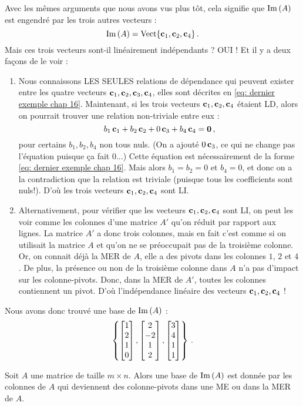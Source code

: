 \begin{myprob}
\begin{mysol}
Avec les mêmes arguments que nous avons vus plus tôt, cela signifie que $\operatorname{Im}\,(A)$ est engendré par les trois autres vecteurs :
$$
\operatorname{Im}\,(A) = \textrm{Vect}\{ \mathbf{c}_1, \mathbf{c}_2, \mathbf{c}_4\}\,.
$$
Mais ces trois vecteurs sont-il linéairement indépendants ?  OUI !  Et il y a deux façons de le voir :
\begin{enumerate}
\item Nous connaissons LES SEULES relations de dépendance qui peuvent exister entre les quatre vecteurs $\mathbf{c}_1, \mathbf{c}_2,\mathbf{c}_3, \mathbf{c}_4$, elles sont décrites en \eqref{eq: dernier exemple chap 16}.  Maintenant, si les
trois vecteurs $\mathbf{c}_1, \mathbf{c}_2, \mathbf{c}_4$ étaient LD, alors on pourrait trouver
une relation non-triviale entre eux :
$$
b_1 \,\mathbf{c}_1 + b_2\,\mathbf{c}_2 + 0\, \mathbf{c}_3+ b_4 \,\mathbf{c}_4 = \mathbf{0}\,,
$$
pour certains $b_1, b_2, b_4$ non tous nuls.
(On a ajouté $0\,\mathbf{c}_3$, ce qui ne change pas l'équation puisque ça fait $0$...)
Cette équation est nécessairement de la forme \eqref{eq: dernier exemple chap 16}. Mais alors $b_1=b_2=0$ et $b_4=0$, et donc on a la contradiction que la relation est triviale (puisque tous les coefficients sont nuls!). D'où les trois vecteurs $\mathbf{c}_1, \mathbf{c}_2, \mathbf{c}_4$ sont LI.
\item Alternativement, pour vérifier que les vecteurs $\mathbf{c}_1, \mathbf{c}_2, \mathbf{c}_4$ sont LI, on peut les voir comme les colonnes d'une matrice $A'$ qu'on réduit par rapport aux lignes. La matrice $A'$ a donc trois colonnes, mais en fait c'est comme si on utilisait la matrice $A$ et qu'on ne se préoccupait pas de la troisième colonne. Or, on connait déjà la MER de $A$, elle a des pivots dans les colonnes $1$, $2$ et $4$. De plus, la présence ou non de la troisième colonne dans $A$ n'a pas d'impact sur les colonne-pivots. Donc, dans la MER de $A'$, toutes les colonnes contiennent un pivot. D'où l'indépendance linéaire des vecteurs $\mathbf{c}_1, \mathbf{c}_2, \mathbf{c}_4$ !
\end{enumerate}

Nous avons donc trouvé une base de $\operatorname{Im}\,(A)$ :
$$
\left\{ \left[ \begin{matrix} 1\\2\\1\\0 \end{matrix} \right], \left[ \begin{matrix} 2\\-2\\1\\2 \end{matrix} \right], \left[ \begin{matrix} 3\\4\\1\\1 \end{matrix} \right] \right\}\,.
$$
\end{mysol}\end{myprob}

\begin{theorem}
Soit $A$ une matrice de taille $m\times n$.  Alors une base de $\operatorname{Im}\,(A)$ est donnée par les colonnes de $A$ qui deviennent des colonne-pivots dans une ME ou dans la MER de $A$.
\end{theorem}

